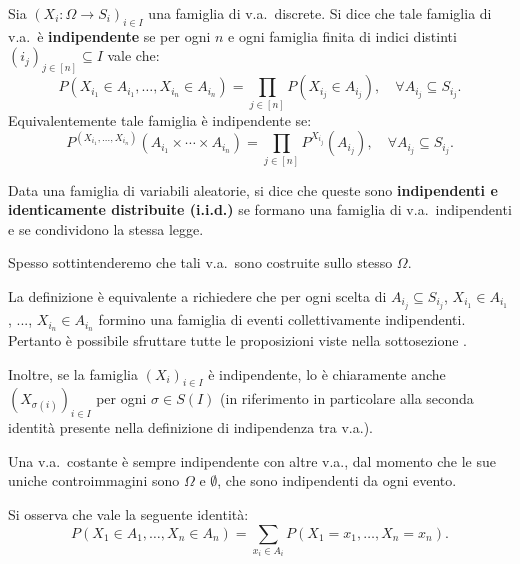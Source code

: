 \begin{multicols*}{2}
\begin{definition}
    Sia $(X_i : \Omega \to S_i)_{i \in I}$ una famiglia di v.a.~discrete. Si dice che tale famiglia di v.a.~è \textbf{indipendente} se per ogni $n$ e ogni famiglia finita di
    indici distinti $(i_j)_{j \in [n]} \subseteq I$ vale che:
    \[
        P(X_{i_1} \in A_{i_1}, \ldots, X_{i_n} \in A_{i_n}) = \prod_{j \in [n]} P(X_{i_j} \in A_{i_j}), \quad \forall A_{i_j} \subseteq S_{i_j}.
    \]
    Equivalentemente tale famiglia è indipendente se:
    \[
        P^{(X_{i_1}, \ldots, X_{i_n})}(A_{i_1} \times \cdots \times A_{i_n}) = \prod_{j \in [n]} P^{X_{i_j}}(A_{i_j}), \quad \forall A_{i_j} \subseteq S_{i_j}.
    \]
\end{definition}

\begin{definition}
    Data una famiglia di variabili aleatorie, si dice che
    queste sono \textbf{indipendenti e identicamente distribuite (i.i.d.)}
    se formano una famiglia di v.a.~indipendenti e se condividono
    la stessa legge. \smallskip

    Spesso sottintenderemo che tali v.a.~sono costruite sullo stesso $\Omega$.
\end{definition}

\begin{remark}
    La definizione è equivalente a richiedere che per ogni scelta di $A_{i_j} \subseteq S_{i_j}$,
    $X_{i_1} \in A_{i_1}$, ..., $X_{i_n} \in A_{i_n}$ formino una famiglia di eventi
    collettivamente indipendenti. Pertanto è possibile sfruttare tutte
    le proposizioni viste nella sottosezione \textit{}. \smallskip

    Inoltre, se la famiglia $(X_i)_{i \in I}$ è indipendente, lo è
    chiaramente anche $(X_{\sigma(i)})_{i \in I}$ per ogni $\sigma \in S(I)$
    (in riferimento in particolare alla seconda identità presente nella definizione
    di indipendenza tra v.a.).
\end{remark}

\begin{remark}
    Una v.a.~costante è sempre indipendente con altre v.a., dal momento che
    le sue uniche controimmagini sono $\Omega$ e $\emptyset$, che sono indipendenti
    da ogni evento.
\end{remark}

\begin{remark}
    Si osserva che vale la seguente identità:
    \[
        P(X_1 \in A_1, \ldots, X_n \in A_n) = \sum_{x_i \in A_i} P(X_1 = x_1, \ldots, X_n = x_n).
    \]
\end{remark}


\end{multicols*}
